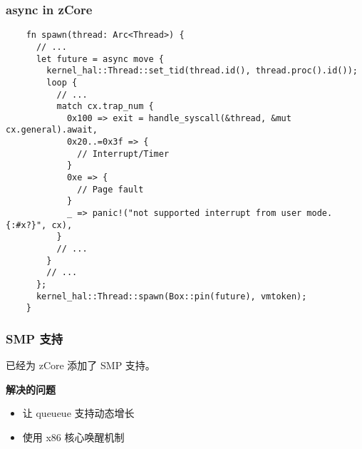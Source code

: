 \documentclass[UTF-8]{ctexbeamer}
\begin{document}
\begin{frame}[fragile]
  \frametitle{async in zCore}

  {
    \scriptsize
    \begin{verbatim}
    fn spawn(thread: Arc<Thread>) {
      // ...
      let future = async move {
        kernel_hal::Thread::set_tid(thread.id(), thread.proc().id());
        loop {
          // ...
          match cx.trap_num {
            0x100 => exit = handle_syscall(&thread, &mut cx.general).await,
            0x20..=0x3f => {
              // Interrupt/Timer
            }
            0xe => {
              // Page fault
            }
            _ => panic!("not supported interrupt from user mode. {:#x?}", cx),
          }
          // ...
        }
        // ...
      };
      kernel_hal::Thread::spawn(Box::pin(future), vmtoken);
    }
  \end{verbatim}
  }
\end{frame}

\begin{frame}
  \frametitle{SMP 支持}

  已经为 zCore 添加了 SMP 支持。

  \pause
  \vspace{1em}

  \textbf{解决的问题}

  \begin{itemize}
    \item 让 queueue 支持动态增长
    \item 使用 x86 核心唤醒机制
  \end{itemize}
\end{frame}
\end{document}
